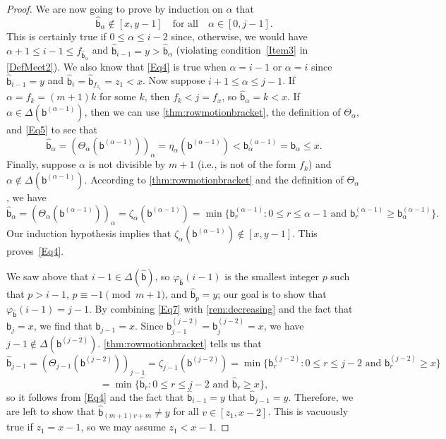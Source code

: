 \documentclass[11pt]{amsart}
\theoremstyle{definition}
\begin{document}
\begin{proof}
We are now going to prove by induction on $\alpha$ that 
\begin{equation}\label{Eq4}
    \widehat{\mathsf b}_\alpha\not\in[x,y-1]\quad \text{for all}\quad \alpha\in[0,j-1].
\end{equation} 
This is certainly true if $0\leq \alpha\leq i-2$ since, otherwise, we would have $\alpha+1\leq i-1\leq f_{\widehat{\mathsf b}_\alpha}$ and $\widehat{\mathsf b}_{i-1}=y>\widehat{\mathsf b}_\alpha$ (violating condition~\eqref{Item3} in \cref{DefMeet2}). We also know that \eqref{Eq4} is true when $\alpha=i-1$ or $\alpha=i$ since $\widehat{\mathsf b}_{i-1}=y$ and $\widehat{\mathsf b}_i=\widehat{\mathsf b}_{f_{z_1}}=z_1<x$. Now suppose $i+1\leq \alpha\leq j-1$. If $\alpha=f_k=(m+1)k$ for some $k$, then $f_k<j=f_x$, so $\widehat{\mathsf b}_\alpha=k<x$. If $\alpha\in\Delta(\mathsf b^{(\alpha-1)})$, then we can use \cref{thm:rowmotionbracket}, the definition of $\Theta_\alpha$, and \eqref{Eq5} to see that \[\widehat{\mathsf b}_\alpha=(\Theta_\alpha(\mathsf b^{(\alpha-1)}))_\alpha=\eta_\alpha(\mathsf b^{(\alpha-1)})<\mathsf b_\alpha^{(\alpha-1)}=\mathsf b_\alpha\leq x.\] Finally, suppose $\alpha$ is not divisible by $m+1$ (i.e., is not of the form $f_k$) and $\alpha\not\in\Delta(\mathsf b^{(\alpha-1)})$. According to \cref{thm:rowmotionbracket} and the definition of $\Theta_\alpha$, we have \[\widehat{\mathsf b}_\alpha=(\Theta_\alpha(\mathsf b^{(\alpha-1)}))_\alpha=\zeta_\alpha(\mathsf b^{(\alpha-1)})=\min\{\mathsf b_r^{(\alpha-1)}:0\leq r\leq \alpha-1\text{ and }\mathsf b_r^{(\alpha-1)}\geq \mathsf b_\alpha^{(\alpha-1)}\}.\] Our induction hypothesis implies that $\zeta_\alpha(\mathsf b^{(\alpha-1)})\not\in[x,y-1]$. This proves~\eqref{Eq4}.  

We saw above that $i-1\in\Delta(\widehat{\mathsf b})$, so $\varphi_{\widehat{\mathsf b}}(i-1)$ is the smallest integer $p$ such that $p>i-1$, $p\equiv -1\pmod{m+1}$, and $\widehat{\mathsf b}_p=y$; our goal is to show that $\varphi_{\widehat{\mathsf b}}(i-1)=j-1$. By combining \eqref{Eq7} with \cref{rem:decreasing} and the fact that $\mathsf b_j=x$, we find that $\mathsf b_{j-1}=x$. Since $\mathsf b_{j-1}^{(j-2)}=\mathsf b_j^{(j-2)}=x$, we have $j-1\not\in\Delta(\mathsf b^{(j-2)})$.  \cref{thm:rowmotionbracket} tells us that \[\widehat{\mathsf b}_{j-1}=(\Theta_{j-1}(\mathsf b^{(j-2)}))_{j-1}=\zeta_{j-1}(\mathsf b^{(j-2)})=\min\{\mathsf b_r^{(j-2)}:0\leq r\leq j-2\text{ and }\mathsf b_r^{(j-2)}\geq x\}\] \[=\min\{\widehat{\mathsf b}_r:0\leq r\leq j-2\text{ and }\widehat{\mathsf b}_r\geq x\},\] so it follows from \eqref{Eq4} and the fact that $\widehat{\mathsf b}_{i-1}=y$ that $\widehat{\mathsf b}_{j-1}=y$. Therefore, we are left to show that $\widehat{\mathsf b}_{(m+1)v+m}\neq y$ for all $v\in[z_1,x-2]$. This is vacuously true if $z_1=x-1$, so we may assume $z_1<x-1$.   


\end{proof}
\end{document}
